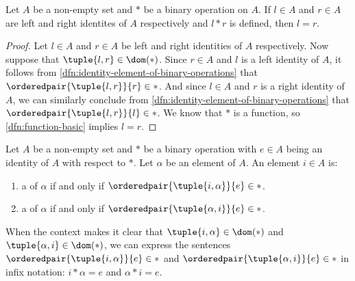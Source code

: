 \begin{thm}
    \label{thm:equality-of-left-and-right-identities}
    Let \( A \) be a non-empty set and \( \ast \) be a binary operation on \( A \). If \( l \in A \) and \( r \in A \) are left and right
    identites of \( A \) respectively and \( l \ast r \) is defined, then \( l = r \).
\end{thm}

\begin{proof}
    Let \( l \in A \) and \( r \in A \) be left and right identities of \( A \) respectively. Now suppose that
    \( \tuple{l,r} \in \dom (\ast) \). Since \( r \in A \) and \( l \) is a left identity of \( A \), it follows
    from \cref{dfn:identity-element-of-binary-operations} that \( \orderedpair{\tuple{l,r}}{r} \in \ast \). And
    since \( l \in A \) and \( r \) is a right identity of \( A \), we can similarly conclude from \cref{dfn:identity-element-of-binary-operations}
    that \( \orderedpair{\tuple{l,r}}{l} \in \ast \). We know that \( \ast \) is a function, so \cref{dfn:function-basic} implies \( l = r \).
\end{proof}

\begin{dfn}
    \label{dfn:left-and-right-inverses-of-binary-operations}
    Let \( A \) be a non-empty set and \( \ast \) be a binary operation with \( e \in A \) being an identity of \( A \) with respect to \( \ast \).
    Let \( \alpha \) be an element of \( A \). An element \( i \in A \) is:
    \begin{enumerate}[topsep=2pt,noitemsep,label=\textup{\texttt{(\alph*)}}]
        \item a  of \( \alpha \) if and only if \( \orderedpair{\tuple{i,\alpha}}{e} \in \ast \).
        \item a  of \( \alpha \) if and only if \( \orderedpair{\tuple{\alpha,i}}{e} \in \ast \).
    \end{enumerate}
\end{dfn}

\begin{notation}
    When the context makes it clear that \( \tuple{i,\alpha} \in \dom (\ast) \) and \( \tuple{\alpha,i} \in \dom (\ast) \),
    we can express the sentences \( \orderedpair{\tuple{i,\alpha}}{e} \in \ast \) and \( \orderedpair{\tuple{\alpha,i}}{e} \in \ast \) in
    infix notation: \( i \ast \alpha = e \) and \( \alpha \ast i = e \).
\end{notation}

